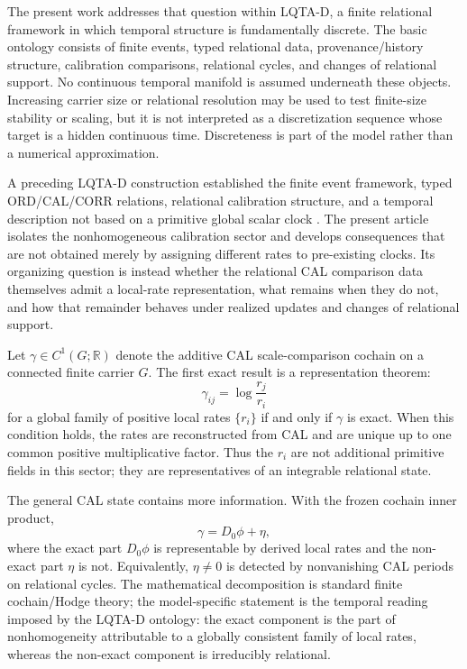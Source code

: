 The present work addresses that question within LQTA-D, a finite relational framework in which temporal structure is fundamentally discrete. The basic ontology consists of finite events, typed relational data, provenance/history structure, calibration comparisons, relational cycles, and changes of relational support. No continuous temporal manifold is assumed underneath these objects. Increasing carrier size or relational resolution may be used to test finite-size stability or scaling, but it is not interpreted as a discretization sequence whose target is a hidden continuous time. Discreteness is part of the model rather than a numerical approximation.

A preceding LQTA-D construction established the finite event framework, typed ORD/CAL/CORR relations, relational calibration structure, and a temporal description not based on a primitive global scalar clock \cite{BojViudes2026TemporalDomains}. The present article isolates the nonhomogeneous calibration sector and develops consequences that are not obtained merely by assigning different rates to pre-existing clocks. Its organizing question is instead whether the relational CAL comparison data themselves admit a local-rate representation, what remains when they do not, and how that remainder behaves under realized updates and changes of relational support.

Let $\gamma\in C^1(G;\mathbb R)$ denote the additive CAL scale-comparison cochain on a connected finite carrier $G$. The first exact result is a representation theorem:
\begin{equation}
\gamma_{ij}=\log\frac{r_j}{r_i}
\label{eq:intro-rate-representation}
\end{equation}
for a global family of positive local rates $\{r_i\}$ if and only if $\gamma$ is exact. When this condition holds, the rates are reconstructed from CAL and are unique up to one common positive multiplicative factor. Thus the $r_i$ are not additional primitive fields in this sector; they are representatives of an integrable relational state.

The general CAL state contains more information. With the frozen cochain inner product,
\begin{equation}
\gamma=D_0\phi+\eta,
\label{eq:intro-decomposition}
\end{equation}
where the exact part $D_0\phi$ is representable by derived local rates and the non-exact part $\eta$ is not. Equivalently, $\eta\neq0$ is detected by nonvanishing CAL periods on relational cycles. The mathematical decomposition is standard finite cochain/Hodge theory; the model-specific statement is the temporal reading imposed by the LQTA-D ontology: the exact component is the part of nonhomogeneity attributable to a globally consistent family of local rates, whereas the non-exact component is irreducibly relational.

